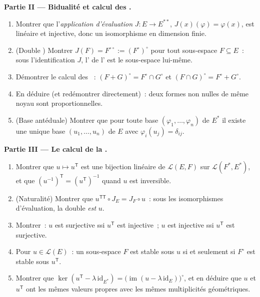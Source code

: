 \begin{problem}
\medskip
\noindent\textbf{Partie II --- Bidualité et calcul des
.}
\begin{enumerate}[resume]
  \item Montrer que l'\emph{application d'évaluation} $J \colon E \to
        E^{**}$, $J(x)(\varphi) = \varphi(x)$, est linéaire et
        injective, donc un isomorphisme en dimension finie.
  \item (Double ) Montrer $J(F) = F^{\circ\circ} :=
        (F^\circ)^\circ$ pour tout sous-espace $F \subseteq E$~: sous
        l'identification $J$, l' de l'
        est le sous-espace lui-même.
  \item Démontrer le calcul des ~: $(F + G)^\circ = F^\circ
        \cap G^\circ$ et $(F \cap G)^\circ = F^\circ + G^\circ$.
  \item En déduire (et redémontrer directement)~: deux formes non
        nulles de même noyau sont proportionnelles.
  \item (Base antéduale) Montrer que pour toute base $(\varphi_1,
        \dots, \varphi_n)$ de $E^*$ il existe une unique base
        $(u_1, \dots, u_n)$ de $E$ avec $\varphi_i(u_j) =
        \delta_{ij}$.
\end{enumerate}

\medskip
\noindent\textbf{Partie III --- Le calcul de la .}
\begin{enumerate}[resume]
  \item Montrer que $u \mapsto u^{\mathsf T}$ est une bijection
        linéaire de $\mathcal{L}(E, F)$ sur $\mathcal{L}(F^*, E^*)$,
        et que $(u^{-1})^{\mathsf T} = (u^{\mathsf T})^{-1}$
        quand $u$ est inversible.
  \item (Naturalité) Montrer que $u^{\mathsf T\mathsf T} \circ J_E
        = J_F \circ u$~: sous les isomorphismes d'évaluation, la
        double  \emph{est} $u$.
  \item Montrer~: $u$ est surjective ssi $u^{\mathsf T}$ est injective~;
        $u$ est injective ssi $u^{\mathsf T}$ est surjective.
  \item Pour $u \in \mathcal{L}(E)$~: un sous-espace $F$ est stable
        sous $u$ si et seulement si $F^\circ$ est stable sous
        $u^{\mathsf T}$.
  \item Montrer que $\ker(u^{\mathsf T} - \lambda\,
        \mathrm{id}_{E^*}) = \bigl(\operatorname{im}(u - \lambda\,
        \mathrm{id}_E)\bigr)^\circ$, et en déduire que $u$ et
        $u^{\mathsf T}$ ont les mêmes valeurs propres avec les mêmes
        multiplicités géométriques.
\end{enumerate}


\end{problem}
